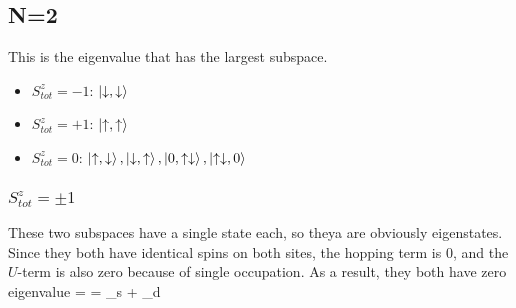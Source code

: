 \documentclass{article}
\begin{document}
\subsection{N=2}
This is the eigenvalue that has the largest subspace.
\begin{itemize}
\item \(S_{tot}^z = -1\): \(\ket{\downarrow,\downarrow}\)
\item \(S_{tot}^z = +1\): \(\ket{\uparrow,\uparrow}\)
\item \(S_{tot}^z = 0\):  \(\ket{\uparrow,\downarrow},\ket{\downarrow,\uparrow},\ket{0,\uparrow\downarrow},\ket{\uparrow\downarrow,0}\)
\end{itemize}

\subsubsection{\(S_{tot}^z = \pm 1\)}
These two subspaces have a single state each, so theya are obviously eigenstates. Since they both have identical spins on both sites, the hopping term is 0, and the \(U\)-term is also zero because of single occupation. As a result, they both have zero eigenvalue
\beq
\ham \ket{\downarrow,\downarrow} = \ham \ket{\uparrow,\uparrow} = \epsilon_s + \epsilon_d
\eeq
\end{document}
